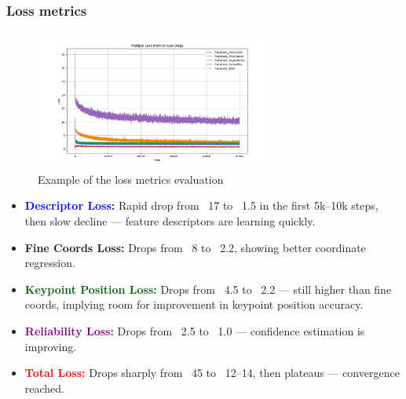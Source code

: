 \subsubsection{Loss metrics}
\begin{figure}[H]
    \centering
    \includegraphics[width=0.7\textwidth]{ressources/multiple_losses_graph_2.png}
    \caption{Example of the loss metrics evaluation}
    \label{fig:loss_metrics_2}
\end{figure}
\begin{itemize}
    \item \textcolor{blue}{\textbf{Descriptor Loss:}} Rapid drop from ~17 to ~1.5 in the first 5k–10k steps, then slow decline — feature descriptors are learning quickly.
    \item \textcolor{myorange}{\textbf{Fine Coords Loss:}} Drops from ~8 to ~2.2, showing better coordinate regression.
    \item \textcolor{darkgreen}{\textbf{Keypoint Position Loss:}} Drops from ~4.5 to ~2.2 — still higher than fine coords, implying room for improvement in keypoint position accuracy.
    \item \textcolor{purple}{\textbf{Reliability Loss:}} Drops from ~2.5 to ~1.0 — confidence estimation is improving.
    \item \textcolor{red}{\textbf{Total Loss:}} Drops sharply from ~45 to ~12–14, then plateaus — convergence reached.
\end{itemize}
